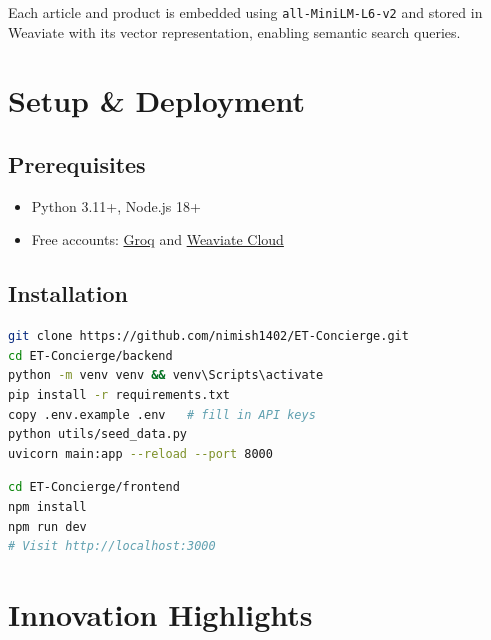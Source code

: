 \documentclass[12pt,a4paper]{article}
\begin{document}
Each article and product is embedded using \texttt{all-MiniLM-L6-v2} and stored in Weaviate with its vector representation, enabling semantic search queries.

\section{Setup \& Deployment}

\subsection{Prerequisites}
\begin{itemize}[noitemsep]
  \item Python 3.11+, Node.js 18+
  \item Free accounts: \href{https://console.groq.com}{Groq} and \href{https://console.weaviate.cloud}{Weaviate Cloud}
\end{itemize}

\subsection{Installation}

\begin{lstlisting}[language=bash, caption=Backend Setup]
git clone https://github.com/nimish1402/ET-Concierge.git
cd ET-Concierge/backend
python -m venv venv && venv\Scripts\activate
pip install -r requirements.txt
copy .env.example .env   # fill in API keys
python utils/seed_data.py
uvicorn main:app --reload --port 8000
\end{lstlisting}

\begin{lstlisting}[language=bash, caption=Frontend Setup]
cd ET-Concierge/frontend
npm install
npm run dev
# Visit http://localhost:3000
\end{lstlisting}

\section{Innovation Highlights}
\end{document}
